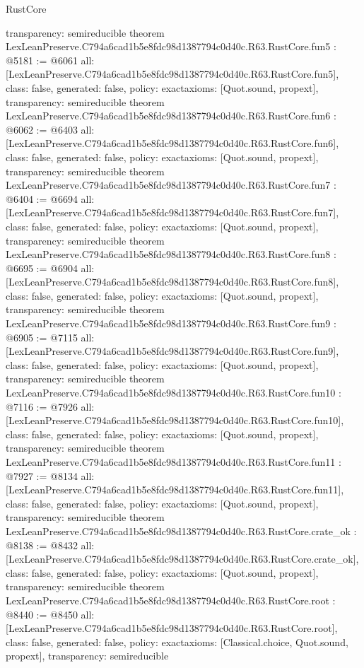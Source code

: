 \begin{lexlean}{RustCore}
\begin{coremodule}
{  transparency: semireducible
}
theorem LexLeanPreserve.C794a6cad1b5e8fdc98d1387794c0d40c.R63.RustCore.fun5 : @5181 := @6061 {
  all: [LexLeanPreserve.C794a6cad1b5e8fdc98d1387794c0d40c.R63.RustCore.fun5],
  class: false,
  generated: false,
  policy: exact{axioms: [Quot.sound, propext]},
  transparency: semireducible
}
theorem LexLeanPreserve.C794a6cad1b5e8fdc98d1387794c0d40c.R63.RustCore.fun6 : @6062 := @6403 {
  all: [LexLeanPreserve.C794a6cad1b5e8fdc98d1387794c0d40c.R63.RustCore.fun6],
  class: false,
  generated: false,
  policy: exact{axioms: [Quot.sound, propext]},
  transparency: semireducible
}
theorem LexLeanPreserve.C794a6cad1b5e8fdc98d1387794c0d40c.R63.RustCore.fun7 : @6404 := @6694 {
  all: [LexLeanPreserve.C794a6cad1b5e8fdc98d1387794c0d40c.R63.RustCore.fun7],
  class: false,
  generated: false,
  policy: exact{axioms: [Quot.sound, propext]},
  transparency: semireducible
}
theorem LexLeanPreserve.C794a6cad1b5e8fdc98d1387794c0d40c.R63.RustCore.fun8 : @6695 := @6904 {
  all: [LexLeanPreserve.C794a6cad1b5e8fdc98d1387794c0d40c.R63.RustCore.fun8],
  class: false,
  generated: false,
  policy: exact{axioms: [Quot.sound, propext]},
  transparency: semireducible
}
theorem LexLeanPreserve.C794a6cad1b5e8fdc98d1387794c0d40c.R63.RustCore.fun9 : @6905 := @7115 {
  all: [LexLeanPreserve.C794a6cad1b5e8fdc98d1387794c0d40c.R63.RustCore.fun9],
  class: false,
  generated: false,
  policy: exact{axioms: [Quot.sound, propext]},
  transparency: semireducible
}
theorem LexLeanPreserve.C794a6cad1b5e8fdc98d1387794c0d40c.R63.RustCore.fun10 : @7116 := @7926 {
  all: [LexLeanPreserve.C794a6cad1b5e8fdc98d1387794c0d40c.R63.RustCore.fun10],
  class: false,
  generated: false,
  policy: exact{axioms: [Quot.sound, propext]},
  transparency: semireducible
}
theorem LexLeanPreserve.C794a6cad1b5e8fdc98d1387794c0d40c.R63.RustCore.fun11 : @7927 := @8134 {
  all: [LexLeanPreserve.C794a6cad1b5e8fdc98d1387794c0d40c.R63.RustCore.fun11],
  class: false,
  generated: false,
  policy: exact{axioms: [Quot.sound, propext]},
  transparency: semireducible
}
theorem LexLeanPreserve.C794a6cad1b5e8fdc98d1387794c0d40c.R63.RustCore.crate_ok : @8138 := @8432 {
  all: [LexLeanPreserve.C794a6cad1b5e8fdc98d1387794c0d40c.R63.RustCore.crate_ok],
  class: false,
  generated: false,
  policy: exact{axioms: [Quot.sound, propext]},
  transparency: semireducible
}
theorem LexLeanPreserve.C794a6cad1b5e8fdc98d1387794c0d40c.R63.RustCore.root : @8440 := @8450 {
  all: [LexLeanPreserve.C794a6cad1b5e8fdc98d1387794c0d40c.R63.RustCore.root],
  class: false,
  generated: false,
  policy: exact{axioms: [Classical.choice, Quot.sound, propext]},
  transparency: semireducible
}


\end{coremodule}
\end{lexlean}
